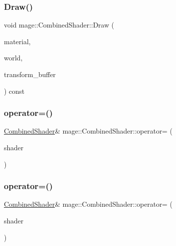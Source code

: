 \subsubsection{\texorpdfstring{Draw()}{Draw()}\hspace{0.1cm}{\footnotesize\ttfamily [3/3]}}
{\footnotesize\ttfamily void mage\+::\+Combined\+Shader\+::\+Draw (\begin{DoxyParamCaption}\item[{const \hyperlink{structmage_1_1_material}{Material} \&}]{material,  }\item[{const \hyperlink{classmage_1_1_world}{World} \&}]{world,  }\item[{const \hyperlink{structmage_1_1_transform_buffer}{Transform\+Buffer} \&}]{transform\+\_\+buffer }\end{DoxyParamCaption}) const}

\hypertarget{structmage_1_1_combined_shader_a14859fb597c07309fd269b56af373c02}{}\label{structmage_1_1_combined_shader_a14859fb597c07309fd269b56af373c02} 
\subsubsection{\texorpdfstring{operator=()}{operator=()}\hspace{0.1cm}{\footnotesize\ttfamily [1/2]}}
{\footnotesize\ttfamily \hyperlink{structmage_1_1_combined_shader}{Combined\+Shader}\& mage\+::\+Combined\+Shader\+::operator= (\begin{DoxyParamCaption}\item[{const \hyperlink{structmage_1_1_combined_shader}{Combined\+Shader} \&}]{shader }\end{DoxyParamCaption})\hspace{0.3cm}{\ttfamily [default]}}

\hypertarget{structmage_1_1_combined_shader_ad05cf0e2c4f0cd7d37ad5be971aefd1b}{}\label{structmage_1_1_combined_shader_ad05cf0e2c4f0cd7d37ad5be971aefd1b} 
\subsubsection{\texorpdfstring{operator=()}{operator=()}\hspace{0.1cm}{\footnotesize\ttfamily [2/2]}}
{\footnotesize\ttfamily \hyperlink{structmage_1_1_combined_shader}{Combined\+Shader}\& mage\+::\+Combined\+Shader\+::operator= (\begin{DoxyParamCaption}\item[{\hyperlink{structmage_1_1_combined_shader}{Combined\+Shader} \&\&}]{shader }\end{DoxyParamCaption})\hspace{0.3cm}{\ttfamily [default]}}



